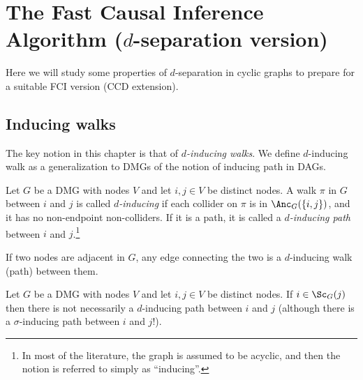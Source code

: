 \section{The Fast Causal Inference Algorithm ($d$-separation version)}\label{sec:fci}

Here we will study some properties of $d$-separation in cyclic graphs to prepare for a suitable FCI version (CCD extension).

\subsection{Inducing walks}

The key notion in this chapter is that of \emph{$d$-inducing walks}.
We define $d$-inducing walk as a generalization to DMGs of the notion of inducing path \cite{VermaPearl1990} in DAGs. %
\begin{Def}\label{def:d-inducing_path}
Let $G$ be a DMG with nodes $V$ and let $i,j \in V$ be distinct nodes.
A walk $\pi$ in $G$ between $i$ and $j$ is called \emph{$d$-inducing} if each collider on $\pi$ is in $\Anc_{G}(\{i,j\})$,
and it has no non-endpoint non-colliders. %
If it is a path, it is called a \emph{$d$-inducing path} between $i$ and $j$.\footnote{In most of the literature, the graph is assumed to be acyclic, and then the notion is referred to simply as ``inducing''.}
\end{Def}
If two nodes are adjacent in $G$, any edge connecting the two is a $d$-inducing walk (path) between them.
\begin{Rem}
Let $G$ be a DMG with nodes $V$ and let $i,j \in V$ be distinct nodes.
If $i \in \Sc_G(j)$ then there is not necessarily a $d$-inducing path between $i$ and $j$ (although there is a $\sigma$-inducing path between $i$ and $j$!).
\end{Rem}

